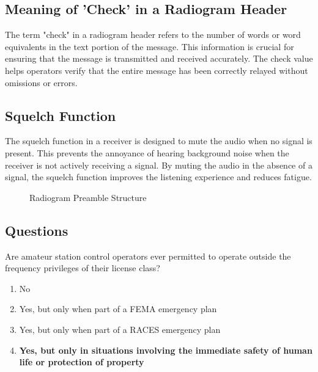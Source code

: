 \subsection*{Meaning of 'Check' in a Radiogram Header}

The term "check" in a radiogram header refers to the number of words or word equivalents in the text portion of the message. This information is crucial for ensuring that the message is transmitted and received accurately. The check value helps operators verify that the entire message has been correctly relayed without omissions or errors.

\subsection*{Squelch Function}

The squelch function in a receiver is designed to mute the audio when no signal is present. This prevents the annoyance of hearing background noise when the receiver is not actively receiving a signal. By muting the audio in the absence of a signal, the squelch function improves the listening experience and reduces fatigue.

\begin{figure}[h]
    \centering
    \caption{Radiogram Preamble Structure}
    \label{fig:radiogram_preamble}
\end{figure}

\subsection*{Questions}

\begin{tcolorbox}[colback=gray!10!white,colframe=black!75!black,title={T2C09}]
    Are amateur station control operators ever permitted to operate outside the frequency privileges of their license class?
    \begin{enumerate}[label=\Alph*,noitemsep]
        \item No
        \item Yes, but only when part of a FEMA emergency plan
        \item Yes, but only when part of a RACES emergency plan
        \item \textbf{Yes, but only in situations involving the immediate safety of human life or protection of property}
    \end{enumerate}
\end{tcolorbox}

